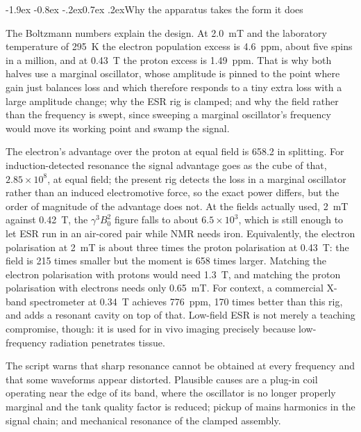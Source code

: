 \documentclass[11pt,a4paper]{article}
\makeatletter
\renewcommand\subsection{\@startsection{subsection}{2}{\z@}%
  {-1.9ex \@plus -0.8ex \@minus -.2ex}{0.7ex \@plus .2ex}{\normalfont\normalsize\bfseries}}
\makeatother
\begin{document}
\subsection{Why the apparatus takes the form it does}

The Boltzmann numbers explain the design. At \SI{2.0}{\milli\tesla} and the laboratory
temperature of \SI{295}{\kelvin} the electron population excess is \SI{4.6}{ppm}, about five
spins in a million, and at \SI{0.43}{\tesla} the proton excess is \SI{1.49}{ppm}.
That is why both halves use a marginal oscillator, whose amplitude is pinned to the point
where gain just balances loss and which therefore responds to a tiny extra loss with a large
amplitude change; why the ESR rig is clamped; and why the field rather than the frequency is
swept, since sweeping a marginal oscillator's frequency would move its working point and swamp the
signal.

The electron's advantage over the proton at equal field is 658.2 in splitting. For
induction-detected resonance the signal advantage goes as the cube of that,
$2.85\times10^{8}$, at equal field; the present rig detects the loss in a marginal oscillator
rather than an induced electromotive force, so the exact power differs, but the order of magnitude
of the advantage does not. At the fields actually used, \SI{2}{\milli\tesla} against
\SI{0.42}{\tesla}, the $\gamma^{3}B_0^{2}$ figure falls to about $6.5\times10^{3}$, which is still
enough to let ESR run in an air-cored pair while NMR needs iron. Equivalently, the electron
polarisation at \SI{2}{\milli\tesla} is about three times the proton polarisation at
\SI{0.43}{\tesla}: the field is 215 times smaller but the moment is 658 times larger. Matching
the electron polarisation with protons would need \SI{1.3}{\tesla}, and matching the proton
polarisation with electrons needs only \SI{0.65}{\milli\tesla}. For context,
a commercial X-band spectrometer at \SI{0.34}{\tesla} achieves \SI{776}{ppm}, 170 times better
than this rig, and adds a resonant cavity on top of that. Low-field ESR is not merely a teaching
compromise, though: it is used for in vivo imaging precisely because low-frequency radiation
penetrates tissue.

The script warns that sharp resonance cannot be obtained at every frequency and that some
waveforms appear distorted. Plausible causes are a plug-in coil operating near the edge of its
band, where the oscillator is no longer properly marginal and the tank quality factor is reduced;
pickup of mains harmonics in the signal chain; and mechanical resonance of the clamped assembly.
\end{document}
